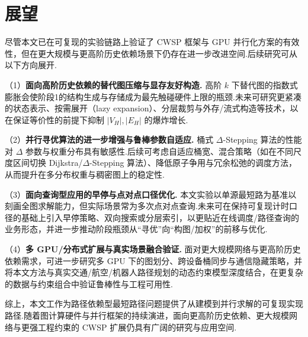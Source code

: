 \section{展望}

尽管本文已在可复现的实验链路上验证了 CWSP 框架与 GPU 并行化方案的有效性，但在更大规模与更高阶历史依赖场景下仍存在进一步改进空间.后续研究可从以下方向展开.

（1）\textbf{面向高阶历史依赖的替代图压缩与显存友好构造.}
高阶 $k$ 下替代图的指数式膨胀会使阶段1的结构生成与存储成为最先触碰硬件上限的瓶颈.未来可研究更紧凑的状态表示、按需展开（lazy expansion）、分层裁剪与外存/流式构造等技术，以在保证等价性的前提下抑制 $|V_H|,|E_H|$ 的爆炸增长.

（2）\textbf{并行寻优算法的进一步增强与鲁棒参数自适应.}
桶式 $\Delta$-Stepping 算法的性能对 $\Delta$ 参数与权重分布具有敏感性.后续可考虑自适应桶宽、混合策略（如在不同尺度区间切换 Dijkstra/$\Delta$-Stepping 算法）、降低原子争用与冗余松弛的调度方法，从而提升在多分布权重与稠密图上的稳定性.

（3）\textbf{面向查询型应用的早停与点对点口径优化.}
本文实验以单源最短路为基准以刻画全图求解能力，但实际场景常为多次点对点查询.未来可在保持可复现计时口径的基础上引入早停策略、双向搜索或分层索引，以更贴近在线调度/路径查询的业务形态，并进一步推动阶段瓶颈从“寻优”向“构图/加权”的前移与优化.

（4）\textbf{多 GPU/分布式扩展与真实场景融合验证.}
面对更大规模网络与更高阶历史依赖需求，可进一步研究多 GPU 下的图划分、跨设备桶同步与通信隐藏策略，并将本文方法与真实交通/航空/机器人路径规划的动态约束模型深度结合，在更复杂的数据与约束组合中验证鲁棒性与工程可用性.

综上，本文工作为路径依赖型最短路径问题提供了从建模到并行求解的可复现实现路径.随着图计算硬件与并行框架的持续演进，面向更高阶历史依赖、更大规模网络与更强工程约束的 CWSP 扩展仍具有广阔的研究与应用空间.
